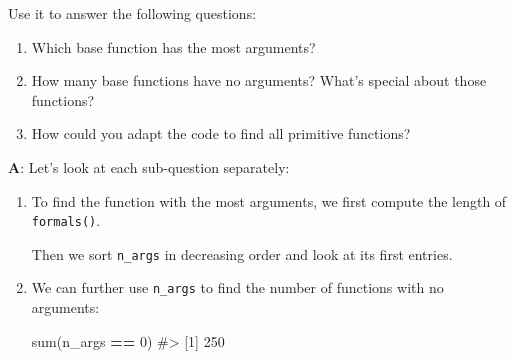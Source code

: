 \documentclass[
]{krantz}
\makeatletter
\newenvironment{Shaded}{\begin{snugshade}}{\end{snugshade}}
\newcommand{\CommentTok}[1]{\textcolor[rgb]{0.56,0.35,0.01}{\textit{#1}}}
\newcommand{\DataTypeTok}[1]{\textcolor[rgb]{0.13,0.29,0.53}{#1}}
\newcommand{\DecValTok}[1]{\textcolor[rgb]{0.00,0.00,0.81}{#1}}
\newcommand{\KeywordTok}[1]{\textcolor[rgb]{0.13,0.29,0.53}{\textbf{#1}}}
\newcommand{\NormalTok}[1]{#1}
\newcommand{\OperatorTok}[1]{\textcolor[rgb]{0.81,0.36,0.00}{\textbf{#1}}}
\newcommand{\OtherTok}[1]{\textcolor[rgb]{0.56,0.35,0.01}{#1}}
\newcommand{\StringTok}[1]{\textcolor[rgb]{0.31,0.60,0.02}{#1}}
\newenvironment{kframe}{%
\medskip{}
\setlength{\fboxsep}{.8em}
 \def\at@end@of@kframe{}%
 \ifinner\ifhmode%
  \def\at@end@of@kframe{\end{minipage}}%
  \begin{minipage}{\columnwidth}%
 \fi\fi%
 \def\FrameCommand##1{\hskip\@totalleftmargin \hskip-\fboxsep
 \colorbox{shadecolor}{##1}\hskip-\fboxsep
     \hskip-\linewidth \hskip-\@totalleftmargin \hskip\columnwidth}%
 \MakeFramed {\advance\hsize-\width
   \@totalleftmargin\z@ \linewidth\hsize
   \@setminipage}}%
 {\par\unskip\endMakeFramed%
 \at@end@of@kframe}
\renewenvironment{Shaded}{\begin{kframe}}{\end{kframe}}
\renewcommand{\KeywordTok} [1]{\textcolor[rgb]{0.00,0.44,0.13}{{#1}}}
\renewcommand{\DataTypeTok}[1]{\textcolor[rgb]{0.56,0.13,0.00}{{#1}}}
\renewcommand{\DecValTok}  [1]{\textcolor[rgb]{0.25,0.63,0.44}{{#1}}}
\renewcommand{\StringTok}  [1]{\textcolor[rgb]{0.25,0.44,0.63}{{#1}}}
\renewcommand{\CommentTok} [1]{\textcolor[rgb]{0.38,0.63,0.69}{{#1}}}
\renewcommand{\OtherTok}   [1]{\textcolor[rgb]{0.00,0.44,0.13}{{#1}}}
\renewcommand{\NormalTok}  [1]{{#1}}
\makeatother
\begin{document}
Use it to answer the following questions:

\begin{enumerate}
\def\labelenumi{\alph{enumi}.}
\item
  Which base function has the most arguments?
\item
  How many base functions have no arguments? What's special about those functions?
\item
  How could you adapt the code to find all primitive functions?
\end{enumerate}

\textbf{{A}}: Let's look at each sub-question separately:

\begin{enumerate}
\def\labelenumi{\alph{enumi}.}
\item
  To find the function with the most arguments, we first compute the length of \texttt{formals()}.

\begin{Shaded}
\end{Shaded}

  Then we sort \texttt{n\_args} in decreasing order and look at its first entries.

\begin{Shaded}
\end{Shaded}
\item
  We can further use \texttt{n\_args} to find the number of functions with no arguments:

\begin{Shaded}
\begin{Highlighting}[]
\KeywordTok{sum}\NormalTok{(n_args }\OperatorTok{==}\StringTok{ }\DecValTok{0}\NormalTok{)}
\CommentTok{#> [1] 250}
\end{Highlighting}
\end{Shaded}


\end{enumerate}
\end{document}
